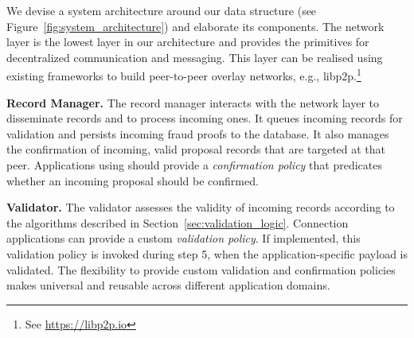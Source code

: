 We devise a system architecture around our \ModelName{} data structure (see Figure~\ref{fig:system_architecture}) and elaborate its components.
The network layer is the lowest layer in our architecture and provides the primitives for decentralized communication and messaging.
This layer can be realised using existing frameworks to build peer-to-peer overlay networks, e.g., libp2p.\footnote{See \url{https://libp2p.io}}

\textbf{Record Manager.}
The record manager interacts with the network layer to disseminate records and to process incoming ones.
It queues incoming records for validation and persists incoming fraud proofs to the database.
It also manages the confirmation of incoming, valid proposal records that are targeted at that peer.
Applications using \ModelName{} should provide a \emph{confirmation policy} that predicates whether an incoming proposal should be confirmed.

\textbf{Validator.}
The validator assesses the validity of incoming records according to the algorithms described in Section~\ref{sec:validation_logic}.
Connection applications can provide a custom \emph{validation policy}.
If implemented, this validation policy is invoked during step 5, when the application-specific payload is validated.
The flexibility to provide custom validation and confirmation policies makes \ModelName{} universal and reusable across different application domains.


